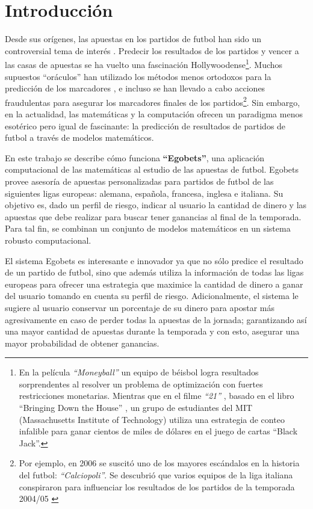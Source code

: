 \chapter{Introducción}

Desde sus orígenes, las apuestas en los partidos de futbol han sido un controversial tema de interés \cite{udovicic1998special}. Predecir los resultados de los partidos y vencer a las casas de apuestas se ha vuelto una fascinación Hollywoodense\footnote{En la película \emph{``Moneyball''} \cite{moneyball} un equipo de béisbol logra resultados sorprendentes al resolver un problema de optimización con fuertes restricciones monetarias. Mientras que en el filme \emph{``21''} \cite{21Movie}, basado en el libro ``Bringing Down the House'' \cite{patrick2008bringing}, un grupo de estudiantes del MIT (Massachusetts Institute of Technology) utiliza una estrategia de conteo infalible para ganar cientos de miles de dólares en el juego de cartas ``Black Jack''.}. Muchos supuestos ``oráculos'' han utilizado los métodos menos ortodoxos para la predicción de los marcadores \cite{prevos2010psychic}, e incluso se han llevado a cabo acciones fraudulentas para asegurar los marcadores finales de los partidos\footnote{Por ejemplo, en 2006 se suscitó uno de los mayores escándalos en la historia del futbol: \emph{``Calciopoli''}. Se descubrió que varios equipos de la liga italiana conspiraron para influenciar los resultados de los partidos de la temporada 2004/05 \cite{distaso2008corruption}}. Sin embargo, en la actualidad, las matemáticas y la computación ofrecen un paradigma menos esotérico pero igual de fascinante: la predicción de resultados de partidos de futbol a través de modelos matemáticos.

En este trabajo se describe cómo funciona \textbf{``Egobets''}, una aplicación computacional de las matemáticas al estudio de las apuestas de futbol. Egobets provee asesoría de apuestas personalizadas para partidos de futbol de las siguientes ligas europeas: alemana, española, francesa, inglesa e italiana. Su objetivo es, dado un perfil de riesgo, indicar al usuario la cantidad de dinero y las apuestas que debe realizar para buscar tener ganancias al final de la temporada. Para tal fin, se combinan un conjunto de modelos matemáticos en un sistema robusto computacional.

El sistema Egobets es interesante e innovador ya que no sólo predice el resultado de un partido de futbol, sino que además utiliza la información de todas las ligas europeas para ofrecer una estrategia que maximice la cantidad de dinero a ganar del usuario tomando en cuenta su perfil de riesgo. Adicionalmente, el sistema le sugiere al usuario conservar un porcentaje de su dinero para apostar más agresivamente en caso de perder todas la apuestas de la jornada; garantizando así una mayor cantidad de apuestas durante la temporada y con esto, asegurar una mayor probabilidad de obtener ganancias.


